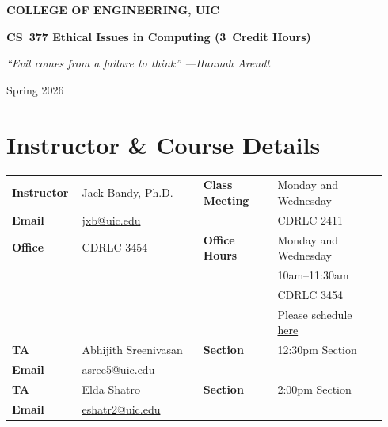 \documentclass[11pt]{article}
\makeatletter
\newcommand{\collegeName}{COLLEGE OF ENGINEERING, UIC}
\newcommand{\courseRubric}{CS}
\newcommand{\courseNumber}{377}
\newcommand{\courseTitle}{Ethical Issues in Computing}
\newcommand{\creditHours}{3}
\newcommand{\termSemesterYear}{Spring 2026}
\newcommand{\taOneName}{Abhijith Sreenivasan}
\newcommand{\taOneEmail}{asree5@uic.edu}
\newcommand{\taOneSectionDesignations}{12:30pm Section}
\newcommand{\taTwoName}{Elda Shatro}
\newcommand{\taTwoEmail}{eshatr2@uic.edu}
\newcommand{\taTwoSectionDesignations}{2:00pm Section}
\makeatother
\begin{document}
\begin{center}
  {\LARGE\bfseries \collegeName}\par
  \vspace{0.75em}
  {\Large\bfseries
    \courseRubric\ \courseNumber\quad
    \courseTitle\quad
    (\creditHours\ Credit Hours)
  }\par
  \vspace{0.5em}
    {\itshape ``Evil comes from a failure to think''   ---Hannah Arendt}\par
  \vspace{0.5em}

  {\large \termSemesterYear}\par
\end{center}

\vspace{0.9\baselineskip}

\section*{Instructor \& Course Details}

\noindent
\begin{tabular}{@{}p{0.16\linewidth}p{0.31\linewidth}p{0.19\linewidth}p{0.28\linewidth}@{}}
\textbf{Instructor} & Jack Bandy, Ph.D.                       & \textbf{Class Meeting} & Monday and Wednesday \\
\textbf{Email}      & \href{mailto:jxb@uic.edu}{jxb@uic.edu} &                        & CDRLC 2411           \\
\textbf{Office}     & CDRLC 3454                              & \textbf{Office Hours}  & Monday and Wednesday \\
                    &                                         &                        & 10am--11:30am        \\
                    &                                         &                        & CDRLC 3454           \\
                    &                                         &                        & Please schedule \href{https://calendar.app.google/P3weJsBwJYiEU6Fk6}{here} \\[1.2em]
\textbf{TA}         & \taOneName                              & \textbf{Section}       & \taOneSectionDesignations \\
\textbf{Email}      & \href{mailto:\taOneEmail}{\taOneEmail}  &                        &                      \\[0.4em]
\textbf{TA}         & \taTwoName                              & \textbf{Section}       & \taTwoSectionDesignations \\
\textbf{Email}      & \href{mailto:\taTwoEmail}{\taTwoEmail}  &                        &                      \\
\end{tabular}
\end{document}
